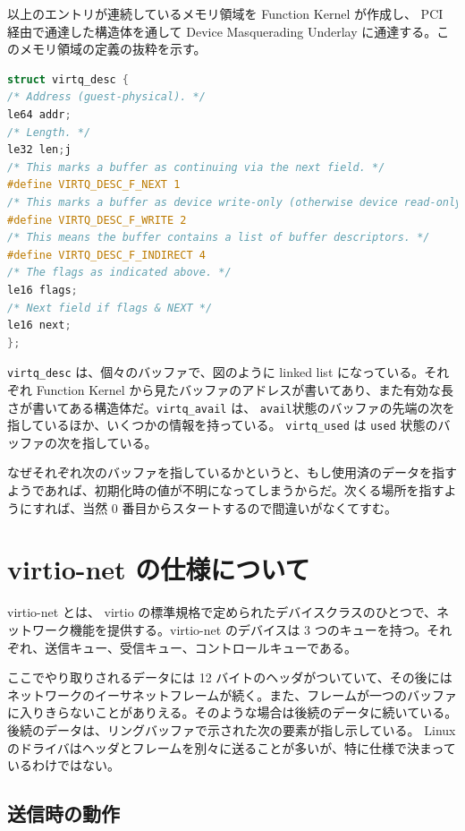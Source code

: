 \documentclass[a4paper,11pt,report]{ltjsbook}
\begin{document}
以上のエントリが連続しているメモリ領域を Function Kernel が作成し、 PCI 経由で通達した構造体を通して Device Masquerading Underlay に通達する。このメモリ領域の定義の抜粋を示す。

\begin{lstlisting}[language=C]
struct virtq_desc {
/* Address (guest-physical). */
le64 addr;
/* Length. */
le32 len;j
/* This marks a buffer as continuing via the next field. */
#define VIRTQ_DESC_F_NEXT 1
/* This marks a buffer as device write-only (otherwise device read-only). */
#define VIRTQ_DESC_F_WRITE 2
/* This means the buffer contains a list of buffer descriptors. */
#define VIRTQ_DESC_F_INDIRECT 4
/* The flags as indicated above. */
le16 flags;
/* Next field if flags & NEXT */
le16 next;
};
\end{lstlisting}

\texttt{virtq\_desc} は、個々のバッファで、図のように linked list になっている。それぞれ Function Kernel から見たバッファのアドレスが書いてあり、また有効な長さが書いてある構造体だ。\texttt{virtq\_avail} は、 \texttt{avail}状態のバッファの先端の次を指しているほか、いくつかの情報を持っている。 \texttt{virtq\_used} は \texttt{used} 状態のバッファの次を指している。

なぜそれぞれ次のバッファを指しているかというと、もし使用済のデータを指すようであれば、初期化時の値が不明になってしまうからだ。次くる場所を指すようにすれば、当然 0 番目からスタートするので間違いがなくてすむ。

\section{virtio-net の仕様について}

virtio-net とは、 virtio の標準規格\cite{virtio_spec}で定められたデバイスクラスのひとつで、ネットワーク機能を提供する。virtio-net のデバイスは 3 つのキューを持つ。それぞれ、送信キュー、受信キュー、コントロールキューである。

ここでやり取りされるデータには 12 バイトのヘッダがついていて、その後にはネットワークのイーサネットフレームが続く。また、フレームが一つのバッファに入りきらないことがありえる。そのような場合は後続のデータに続いている。後続のデータは、リングバッファで示された次の要素が指し示している。 Linux のドライバはヘッダとフレームを別々に送ることが多いが、特に仕様で決まっているわけではない。

\subsection{送信時の動作}
\end{document}
